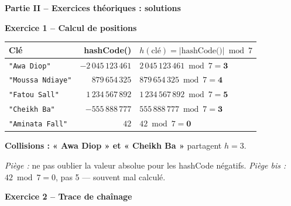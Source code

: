 \documentclass[10pt,a4paper]{article}
\newcommand{\cor}[1]{{\color{corrcolor}\textbf{#1}}}
\newcommand{\corm}[1]{{\color{corrcolor}#1}}
\begin{document}
\textbf{\Large Partie II -- Exercices théoriques : solutions}

\vspace{0.3cm}

\textbf{\large Exercice 1 -- Calcul de positions}

\vspace{0.15cm}

{\small
\renewcommand{\arraystretch}{1.4}
\begin{tabular}{|l|r|l|}
\hline
\textbf{Clé} & \textbf{hashCode()} & \textbf{$h(\text{clé}) = |\text{hashCode()}| \bmod 7$} \\
\hline
\texttt{"Awa Diop"} & $-2\,045\,123\,461$ & \corm{$2\,045\,123\,461 \bmod 7 = \mathbf{3}$} \\
\hline
\texttt{"Moussa Ndiaye"} & $879\,654\,325$ & \corm{$879\,654\,325 \bmod 7 = \mathbf{4}$} \\
\hline
\texttt{"Fatou Sall"} & $1\,234\,567\,892$ & \corm{$1\,234\,567\,892 \bmod 7 = \mathbf{5}$} \\
\hline
\texttt{"Cheikh Ba"} & $-555\,888\,777$ & \corm{$555\,888\,777 \bmod 7 = \mathbf{3}$} \\
\hline
\texttt{"Aminata Fall"} & $42$ & \corm{$42 \bmod 7 = \mathbf{0}$} \\
\hline
\end{tabular}
}

\vspace{0.2cm}

\textbf{Collisions :} \cor{« Awa Diop » et « Cheikh Ba »} partagent $h = 3$.

\medskip

\corm{\textit{Piège :} ne pas oublier la valeur absolue pour les hashCode négatifs. \textit{Piège bis :} $42 \bmod 7 = 0$, pas 5 --- souvent mal calculé.}

\vspace{0.4cm}

\textbf{\large Exercice 2 -- Trace de chaînage}

\vspace{0.15cm}
\end{document}
